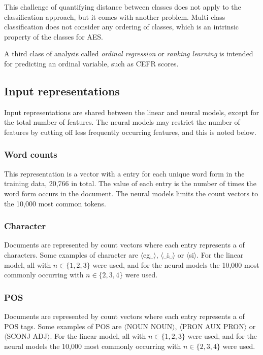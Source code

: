 This challenge of quantifying distance between classes does not apply to the
classification approach, but it comes with another problem. Multi-class
classification does not consider any ordering of classes, which is an
intrinsic property of the classes for AES.

A third class of analysis called \emph{ordinal regression} or \emph{ranking
learning} is intended for predicting an ordinal variable, such as CEFR scores.


\subsection{Input representations}

Input representations are shared between the linear and neural models, except
for the total number of features. The neural models may restrict the number
of features by cutting off less frequently occurring features, and this is
noted below.

\subsubsection*{Word counts}

This representation is a vector with a entry for each unique word form in the
training data, 20,766 in total. The value of each entry is the number of
times the word form occurs in the document. The neural models limits the
count vectors to the 10,000 most common tokens.

\subsubsection*{Character \ngrams}

Documents are represented by count vectors where each entry represents a
\ngram of characters. Some examples of character \ngrams are
$\langle$eg␣$\rangle$, $\langle$␣i␣$\rangle$ or $\langle$si$\rangle$. For the
linear model, all \ngrams with $n\in \{1,2,3\}$ were used, and for the neural
models the 10,000 most commonly occurring \ngrams with $n\in \{2,3,4\}$ were
used.

\subsubsection*{POS \ngrams}

Documents are represented by count vectors where each entry represents a
\ngram of POS tags. Some examples of POS \ngrams are $\langle$NOUN
NOUN$\rangle$, $\langle$PRON AUX PRON$\rangle$ or $\langle$SCONJ
ADJ$\rangle$. For the linear model, all \ngrams with $n\in \{1,2,3\}$ were
used, and for the neural models the 10,000 most commonly occurring \ngrams
with $n\in \{2,3,4\}$ were used.

